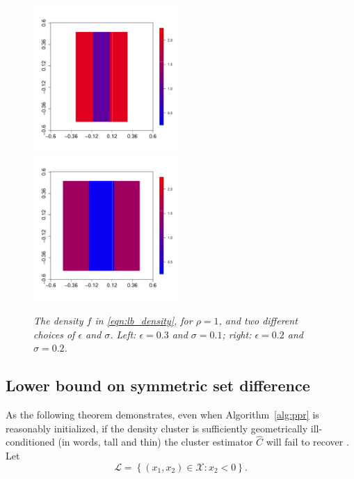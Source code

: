 \documentclass[11pt,twoside]{article}
\newcommand{\set}[1]{\left\{#1\right\}}
\newcommand{\1}{\mathbf{1}}
\newcommand{\mc}[1]{\mathcal{#1}}
\newcommand{\wh}[1]{\widehat{#1}}
\begin{document}
\begin{figure}[tb]
	\centering
	\includegraphics[width=0.495\textwidth]{plots/lower_bound/lower_bound_1}
	\includegraphics[width=0.495\textwidth]{plots/lower_bound/lower_bound_2}
	\caption{\it\small The density $f$ in \eqref{eqn:lb_density}, for
		$\rho=1$, and two different choices of $\epsilon$ and $\sigma$. Left:
		$\epsilon = 0.3$ and $\sigma = 0.1$; right: $\epsilon = 0.2$ and 
		$\sigma = 0.2$.} 
	\label{fig:hard_case}
\end{figure}

\subsection{Lower bound on symmetric set difference}
As the following theorem demonstrates, even when Algorithm~\ref{alg:ppr} is reasonably initialized, if the density cluster \smash{$\mc{C}^{(1)}$} is sufficiently geometrically ill-conditioned (in words, tall and thin) the cluster estimator $\wh{C}$ will fail to recover \smash{$\mc{C}^{(1)}$}. Let
\begin{equation}
\label{eqn:lower_set}
\mc{L} = \set{(x_1,x_2) \in \mc{X}: x_2 < 0}.
\end{equation}
\end{document}
